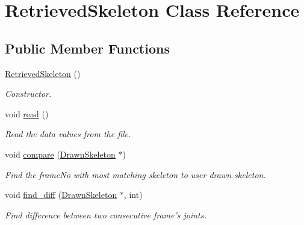\hypertarget{classRetrievedSkeleton}{\section{\-Retrieved\-Skeleton \-Class \-Reference}
\label{classRetrievedSkeleton}
}
\subsection*{\-Public \-Member \-Functions}
\begin{DoxyCompactItemize}
\item 
\hypertarget{classRetrievedSkeleton_a09515a4be7994c3dc097b26b9f50276a}{\hyperlink{classRetrievedSkeleton_a09515a4be7994c3dc097b26b9f50276a}{\-Retrieved\-Skeleton} ()}\label{classRetrievedSkeleton_a09515a4be7994c3dc097b26b9f50276a}

\begin{DoxyCompactList}\small\item\em \-Constructor. \end{DoxyCompactList}\item 
\hypertarget{classRetrievedSkeleton_ab0b91142796e5bce5653b47a7449d54d}{void \hyperlink{classRetrievedSkeleton_ab0b91142796e5bce5653b47a7449d54d}{read} ()}\label{classRetrievedSkeleton_ab0b91142796e5bce5653b47a7449d54d}

\begin{DoxyCompactList}\small\item\em \-Read the data values from the file. \end{DoxyCompactList}\item 
void \hyperlink{classRetrievedSkeleton_aff6b1eec8bb28e9571c6d81f3b4ee6a5}{compare} (\hyperlink{classDrawnSkeleton}{\-Drawn\-Skeleton} $\ast$)
\begin{DoxyCompactList}\small\item\em \-Find the frame\-No with most matching skeleton to user drawn skeleton. \end{DoxyCompactList}\item 
void \hyperlink{classRetrievedSkeleton_ab958835824565862540ba0cc701358da}{find\-\_\-diff} (\hyperlink{classDrawnSkeleton}{\-Drawn\-Skeleton} $\ast$, int)
\begin{DoxyCompactList}\small\item\em \-Find difference between two consecutive frame's joints. \end{DoxyCompactList}\end{DoxyCompactItemize}
